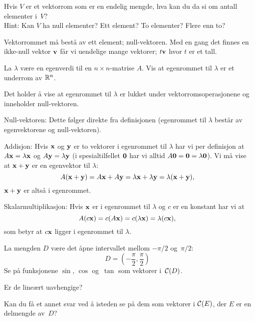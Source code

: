 \begin{oppgave}
Hvis $V$ er et vektorrom som er en endelig mengde, hva kan du da si om
antall elementer i~$V$?
\\
Hint: Kan $V$ ha null elementer?  Ett element?  To elementer?  Flere
enn to?
\end{oppgave}

\begin{losning}
Vektorrommet må bestå av ett element; null-vektoren. Med en gang det finnes en ikke-null vektor $\mathbf{v}$ får vi uendelige mange vektorer; $t\mathbf{v}$ hvor $t$ er et tall.
\end{losning}


\begin{oppgave}
La $\lambda$ være en egenverdi til en $n\times n$-matrise $A$. Vis at egenrommet til $\lambda$ er et underrom av $\mathbb{R}^n$.
\end{oppgave}

\begin{losning}
Det holder å vise at egenrommet til $\lambda$ er lukket under vektorromsoperasjonene og inneholder null-vektoren.

\noindent
Null-vektoren: Dette følger direkte fra definisjonen (egenrommet til $\lambda$ består av egenvektorene og null-vektoren).


\noindent
Addisjon: Hvis $\mathbf{x}$ og $\mathbf{y}$ er to vektorer i egenrommet til $\lambda$ har vi per definisjon at $A\mathbf{x}=\lambda \mathbf{x}$ og $A\mathbf{y}=\lambda \mathbf{y}$ (i spesialtilfellet $\mathbf{0}$ har vi alltid $A\mathbf{0}=\mathbf{0}=\lambda \mathbf{0}$). Vi må vise at $\mathbf{x}+\mathbf{y}$ er en egenvektor til $\lambda$: $$A(\mathbf{x}+\mathbf{y})=A\mathbf{x}+A\mathbf{y}=\lambda \mathbf{x}+ \lambda \mathbf{y}=\lambda(\mathbf{x}+\mathbf{y}),$$ $\mathbf{x}+\mathbf{y}$ er altså i egenrommet.

\noindent
Skalarmultiplikasjon: Hvis $\mathbf{x}$ er i egenrommet til $\lambda$ og $c$ er en konstant har vi at $$A(c\mathbf{x})=c(A \mathbf{x})=c(\lambda \mathbf{x})=\lambda(c \mathbf{x}),$$ som betyr at $c\mathbf{x}$ ligger i egenrommet til $\lambda$.
\end{losning}





\begin{oppgave}
La mengden $D$ være det åpne intervallet mellom $-\pi/2$ og~$\pi/2$:
\[
D = \left( - \frac{\pi}{2}, \frac{\pi}{2} \right)
\]
Se på funksjonene $\sin$, $\cos$ og~$\tan$ som vektorer i~$\mathcal{C}(D)$.
\begin{punkt}
Er de lineært uavhengige?
\end{punkt}
\begin{punkt}
Kan du få et annet svar ved å isteden se på dem som vektorer i
$\mathcal{C}(E)$, der $E$ er en delmengde av~$D$?
\end{punkt}
\end{oppgave}

